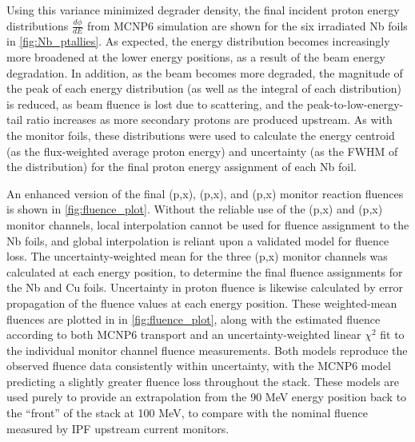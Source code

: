 Using this variance minimized degrader density, the final incident proton  energy distributions $\frac{d\phi}{dE}$ from MCNP6 simulation are shown for the six irradiated Nb foils in \autoref{fig:Nb_ptallies}. 
As expected, the energy distribution becomes increasingly more broadened at the lower energy positions, as a result of the beam energy degradation.
In addition, as the beam becomes more degraded, the magnitude of the peak of each energy distribution (as well as the integral of each distribution) is reduced, as beam fluence is lost due to scattering, and the peak-to-low-energy-tail ratio increases as more  secondary protons are produced upstream.
As with the monitor foils, these distributions were used to calculate the  energy centroid  (as the  flux-weighted average proton  energy) and  uncertainty (as the FWHM of the distribution) for the final proton energy assignment of each Nb foil.





An enhanced version of the final (p,x), (p,x), and (p,x) monitor reaction fluences is shown in \autoref{fig:fluence_plot}.
Without the reliable use of the  (p,x) and (p,x) monitor channels, local interpolation cannot be used for fluence assignment to the Nb foils, and global interpolation is reliant upon a validated model for fluence loss.
The uncertainty-weighted mean  for the three (p,x) monitor channels was calculated at each energy position, to determine the final fluence assignments for the Nb and Cu foils.
Uncertainty in proton fluence  is likewise calculated by error propagation of the fluence values  at each energy position.
These weighted-mean fluences are  plotted in in \autoref{fig:fluence_plot}, along with the estimated fluence according to both  MCNP6 transport 
and an uncertainty-weighted linear $\chi^2$ fit to the individual monitor channel fluence measurements.
Both models reproduce the observed fluence data consistently within uncertainty, with the MCNP6 model predicting a slightly greater fluence loss throughout the stack.
These models are used purely to provide an extrapolation from the 90 MeV energy position back to the \enquote{front} of the stack at 100 MeV, to compare with the nominal fluence measured by  IPF upstream current monitors.


